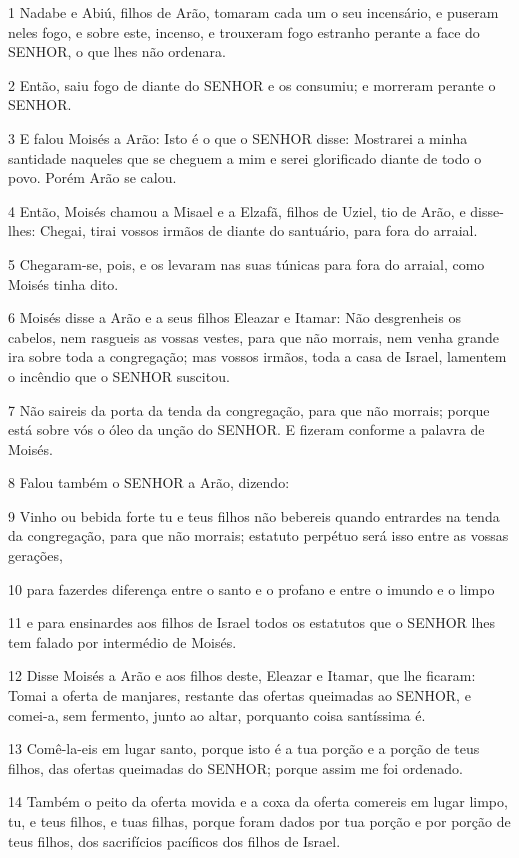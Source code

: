 \par 1 Nadabe e Abiú, filhos de Arão, tomaram cada um o seu incensário, e puseram neles fogo, e sobre este, incenso, e trouxeram fogo estranho perante a face do SENHOR, o que lhes não ordenara.
\par 2 Então, saiu fogo de diante do SENHOR e os consumiu; e morreram perante o SENHOR.
\par 3 E falou Moisés a Arão: Isto é o que o SENHOR disse: Mostrarei a minha santidade naqueles que se cheguem a mim e serei glorificado diante de todo o povo. Porém Arão se calou.
\par 4 Então, Moisés chamou a Misael e a Elzafã, filhos de Uziel, tio de Arão, e disse-lhes: Chegai, tirai vossos irmãos de diante do santuário, para fora do arraial.
\par 5 Chegaram-se, pois, e os levaram nas suas túnicas para fora do arraial, como Moisés tinha dito.
\par 6 Moisés disse a Arão e a seus filhos Eleazar e Itamar: Não desgrenheis os cabelos, nem rasgueis as vossas vestes, para que não morrais, nem venha grande ira sobre toda a congregação; mas vossos irmãos, toda a casa de Israel, lamentem o incêndio que o SENHOR suscitou.
\par 7 Não saireis da porta da tenda da congregação, para que não morrais; porque está sobre vós o óleo da unção do SENHOR. E fizeram conforme a palavra de Moisés.
\par 8 Falou também o SENHOR a Arão, dizendo:
\par 9 Vinho ou bebida forte tu e teus filhos não bebereis quando entrardes na tenda da congregação, para que não morrais; estatuto perpétuo será isso entre as vossas gerações,
\par 10 para fazerdes diferença entre o santo e o profano e entre o imundo e o limpo
\par 11 e para ensinardes aos filhos de Israel todos os estatutos que o SENHOR lhes tem falado por intermédio de Moisés.
\par 12 Disse Moisés a Arão e aos filhos deste, Eleazar e Itamar, que lhe ficaram: Tomai a oferta de manjares, restante das ofertas queimadas ao SENHOR, e comei-a, sem fermento, junto ao altar, porquanto coisa santíssima é.
\par 13 Comê-la-eis em lugar santo, porque isto é a tua porção e a porção de teus filhos, das ofertas queimadas do SENHOR; porque assim me foi ordenado.
\par 14 Também o peito da oferta movida e a coxa da oferta comereis em lugar limpo, tu, e teus filhos, e tuas filhas, porque foram dados por tua porção e por porção de teus filhos, dos sacrifícios pacíficos dos filhos de Israel.
